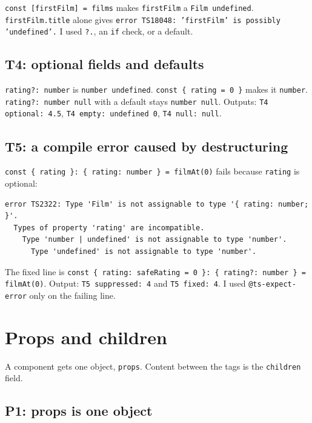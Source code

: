 \documentclass[
  11pt,
]{article}
\begin{document}
\texttt{const [firstFilm] = films} makes
\texttt{firstFilm} a
\texttt{Film \textbar{} undefined}.
\texttt{firstFilm.title} alone gives
\texttt{error TS18048: 'firstFilm' is possibly 'undefined'.}
I used \texttt{?.}, an \texttt{if}
check, or a default.

\subsection{T4: optional fields and
defaults}\label{t4-optional-fields-and-defaults}

\texttt{rating?: number} is
\texttt{number \textbar{} undefined}.
\texttt{const \{ rating = 0 \}} makes it
\texttt{number}.
\texttt{rating?: number \textbar{} null} with a default stays
\texttt{number \textbar{} null}. Outputs:
\texttt{T4 optional: 4.5},
\texttt{T4 empty: undefined 0},
\texttt{T4 null: null}.

\subsection{T5: a compile error caused by
destructuring}\label{t5-a-compile-error-caused-by-destructuring}

\texttt{const \{ rating \}: \{ rating: number \} = filmAt(0)}
fails because \texttt{rating} is optional:

\begin{lstlisting}
error TS2322: Type 'Film' is not assignable to type '{ rating: number; }'.
  Types of property 'rating' are incompatible.
    Type 'number | undefined' is not assignable to type 'number'.
      Type 'undefined' is not assignable to type 'number'.
\end{lstlisting}

The fixed line is
\texttt{const \{ rating: safeRating = 0 \}: \{ rating?: number \} = filmAt(0)}.
Output: \texttt{T5 suppressed: 4} and
\texttt{T5 fixed: 4}. I used
\texttt{@ts-expect-error} only on the failing line.

\section{Props and children}\label{props-and-children}

A component gets one object, \texttt{props}. Content
between the tags is the \texttt{children} field.

\subsection{P1: props is one object}\label{p1-props-is-one-object}
\end{document}
